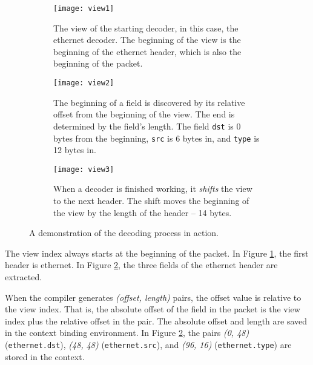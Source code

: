 \begin{figure}[ht]
\begin{subfigure}[t, scale=0.5]{.45\textwidth}
  \centering
  \texttt{[image: view1]}
  \caption{The view of the starting decoder, in this case, the ethernet
decoder. The beginning of the view is the beginning of the ethernet
header, which is also the beginning of the packet.}
  \label{fg:view1}
\end{subfigure}%
\hfill
\begin{subfigure}[t, scale=0.5]{0.45\textwidth}
  \centering
  \texttt{[image: view2]}
  \caption{The beginning of a field is discovered by its relative offset from
the beginning of the view. The end is determined by the field's length. The
field \texttt{dst} is 0 bytes from the beginning, \texttt{src} is 6 bytes in,
and \texttt{type} is 12 bytes in.}
  \label{fg:view2}
\end{subfigure}

\begin{subfigure}[t]{.45\textwidth}
  \centering
  \texttt{[image: view3]}
  \caption{When a decoder is finished working, it \textit{shifts} the view to
the next header. The shift moves the beginning of the view by the length of the
header -- 14 bytes.}
  \label{fg:view3}
\end{subfigure}%
\caption{A demonstration of the decoding process in action.}
\label{fg:decoding}
\end{figure}

 
The view index always starts at the beginning of the packet.
In Figure \ref{fg:view1}, the first header is ethernet.
In Figure \ref{fg:view2}, the three fields of the ethernet header
are extracted.

When the compiler generates \textit{(offset, length)} pairs,
the offset value is relative to the view index. That is, the
absolute offset of the field in the packet is the view index plus 
the relative offset in the pair.
The absolute offset and length are saved in the context binding environment.
In Figure \ref{fg:view2}, the pairs \textit{(0, 48)} (\texttt{ethernet.dst}),
\textit{(48, 48)} (\texttt{ethernet.src}), and \textit{(96, 16)} 
(\texttt{ethernet.type}) are stored in the context.


